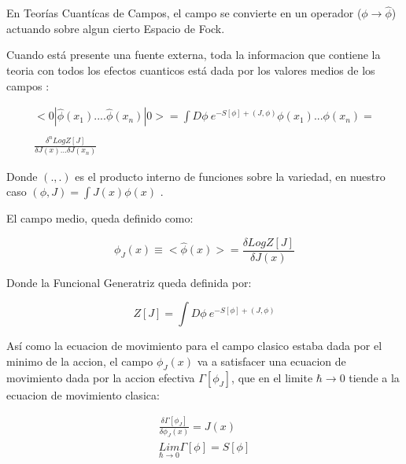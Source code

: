 En Teorías Cuantícas de Campos, el campo se convierte en un operador ($\phi \rightarrow \hat{\phi}$) actuando sobre algun cierto Espacio de Fock.   %



Cuando está presente una fuente externa, toda la informacion que contiene la teoria con todos los efectos cuanticos está dada por los valores medios de los campos :

\begin{equation}
\begin{array}{c}
< 0 | \hat{ \phi  } (x _1) .... \hat{\phi  } (x _n) | 0 > = 
\int D \phi \ e ^{- S[ \phi ] + (J, \phi )} \phi (x _1) ... \phi (x _n) = \\ \\
\frac{\delta ^n Log Z[J] }{ \delta J(x) ... \delta J(x _n) }
\end{array}
\end{equation}

Donde $(.,.) $ es el producto interno de funciones sobre la variedad, en nuestro caso $(\phi,J) = \int J(x) \phi (x)$ .

El campo medio, queda definido como:

\begin{equation}
\phi _J (x) \equiv < \hat{\phi } (x) > = \frac{\delta Log Z[J] }{\delta J(x)} 
\end{equation}

Donde la Funcional Generatriz queda definida por:

\begin{equation}
Z [J] = 
\int D \phi \ e ^{- S[ \phi ] + (J, \phi )}
\end{equation}

Así como la ecuacion de movimiento para el campo clasico estaba dada por el minimo de la accion, el campo $ \phi _J (x) $ va a satisfacer una ecuacion de movimiento dada por la accion efectiva $ \Gamma [\phi _J] $, que en el limite $\hbar \rightarrow 0$ tiende a la ecuacion de movimiento clasica:


\begin{equation}
\begin{array}{c}
\frac{\delta \Gamma [ \phi _J ]  }{\delta \phi _J (x)  } = 
J (x) \\
\underset{ \hbar \rightarrow 0 }{ Lim  } \Gamma [ \phi  ] = S [ \phi ]
\end{array}
\label{eq.accion1}
\end{equation}

